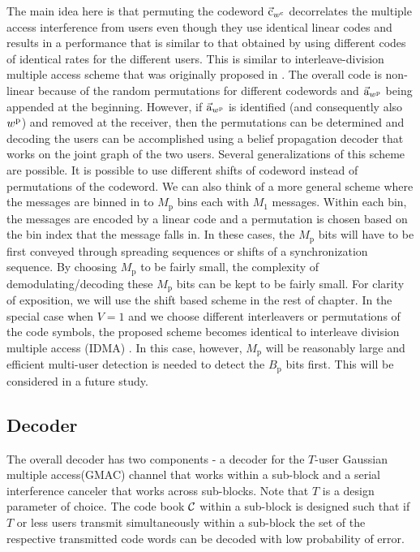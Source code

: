The main idea here is that permuting the codeword $\vec{\mathrm{c}}_{w^\mathrm{c}}$ decorrelates the multiple access interference from users even though they use identical linear codes and results in a performance that is similar to that obtained by using different codes of identical rates for the different users. This is similar to interleave-division multiple access scheme that was originally proposed in \cite{ping2006interleave}. The overall code is non-linear because of the random permutations for different codewords and $\vec{\mathrm{a}}_{w^\mathrm{p}}$ being appended at the beginning. However, if $\vec{\mathrm{a}}_{w^\mathrm{p}}$ is identified (and consequently also $w^\mathrm{p}$) and removed at the receiver, then the permutations can be determined and decoding the users  can be accomplished using a belief propagation decoder that works on the joint graph of the two users.
\iflonger
Several generalizations of this scheme are possible. It is possible to use different shifts of codeword instead of permutations of the codeword. We can also think of a more general scheme where the messages are binned in to $M_\mathrm{p}$ bins each with $M_1$ messages. Within each bin, the messages are encoded by a linear code and a permutation is chosen based on the bin index that the message falls in. In these cases, the $M_\mathrm{p}$ bits will have to be first conveyed through spreading sequences or shifts of a synchronization sequence. By choosing $M_\mathrm{p}$ to be fairly small, the complexity of demodulating/decoding these $M_\mathrm{p}$ bits can be kept to be fairly small. For clarity of exposition, we will use the shift based scheme in the rest of chapter. In the special case when $V=1$ and we choose different interleavers or permutations of the code symbols, the proposed scheme becomes identical to interleave division multiple access (IDMA) \cite{ping2006interleave}. In this case, however, $M_\mathrm{p}$ will be reasonably large and efficient multi-user detection is needed to detect the $B_\mathrm{p}$ bits first. This will be considered in a future study.
\fi

\subsection{Decoder}
The overall decoder has two components - a decoder for the $T$-user Gaussian multiple access(GMAC) channel that works within a sub-block and a serial interference canceler that works across sub-blocks. Note that $T$ is a design parameter of choice. The code book $\mathcal{C}$ within a sub-block is designed such that if $T$ or less users transmit simultaneously within a sub-block the set of the respective transmitted code words can be decoded with low probability of error. 


